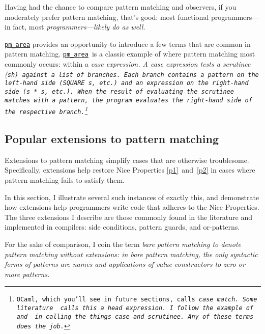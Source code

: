 \documentclass[manuscript,screen,review, 12pt, nonacm]{acmart}
\begin{document}
    Having had the chance to compare pattern matching and observers, if you
    moderately prefer pattern matching, that's good: most functional
    programmers---in fact, most \it{programmers}---likely do as well. 

    \hyperref[fig:pmarea]{\tt{pm\_area}} provides an opportunity to introduce a
    few terms that are common in pattern matching.
    \hyperref[fig:pmarea]{\tt{pm\_area}}~is a classic example of where pattern
    matching most commonly occurs: within a \it{case} expression. A \it{case}
    expression tests a \it{scrutinee} (\tt{sh}) against a list of \it{branches}.
    Each branch contains a pattern on the left-hand side (\tt{SQUARE s}, etc.)
    and an expression on the right-hand side (\tt{s * s}, etc.). When the result
    of evaluating the scrutinee matches with a pattern, the program evaluates
    the right-hand side of the respective branch.\footnote{OCaml, which you'll
    see in future sections, calls \it{case} \tt{match}. Some
    literature~\citep{guardproposal} calls this a \it{head expression}. I follow
    the example of~\citet{bpc} and \citet{maranget} in calling the things
    \it{case} and \it{scrutinee}. Any of these terms does the job.} 

\subsection{Popular extensions to pattern matching}
\label{extensions}

    Extensions to pattern matching simplify cases that are otherwise
    troublesome. Specifically, extensions help restore Nice Properties
    \ref{p1}~and~\ref{p2} in cases where pattern matching fails to satisfy them. 
    
    In this section, I illustrate several such instances of exactly this, and
    demonstrate how extensions help programmers write code that adheres to the
    Nice Properties. The three extensions I describe are those commonly found in
    the literature and implemented in compilers: side conditions, pattern
    guards, and or-patterns. 
    
    For the sake of comparison, I coin the term \it{bare pattern matching} to
    denote pattern matching \it{without} extensions: in bare pattern matching,
    the only syntactic forms of patterns are names and applications of value
    constructors to zero or more patterns. 


\end{document}

